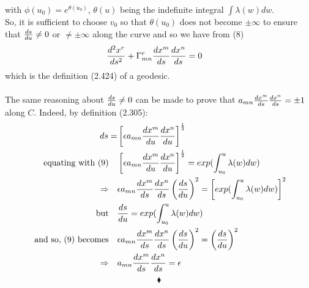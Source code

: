 with $\phi (u_0) =  e^{\theta(u_0)}$, $\theta(u)$ being the indefinite integral $\int \lambda (w)dw $.\\
So, it is sufficient to choose $v_0$ so that $\theta(u_0)$ does not become  $\pm \infty$ to ensure that $\dv{s}{u} \ne 0$ or $ \ne \pm \infty$ along the curve and so we have from (8)
\begin{align}
\dv[2]{x^r}{s} +\Gamma^r_{mn}\dv{x^m}{s}\dv{x^n}{s}  &=  0\end{align}
which is the definition (2.424) of a geodesic.\\\\
The same reasoning about $\dv{s}{u} \ne 0$ can be made to prove that $a_{mn}\dv{x^m}{s}\dv{x^n}{s} = \pm1$ along $C$. Indeed, by definition (2.305):
\begin{align}
\ ds = &\left[ \epsilon a_{mn}\dv{x^m}{u}\dv{x^n}{u}\right]^\frac{1}{2}\\
\text{ equating with (9)} \quad   &\left[ \epsilon a_{mn}\dv{x^m}{u}\dv{x^n}{u}\right]^\frac{1}{2} =                 exp(\int_{u_0}^u \lambda (w)dw)\\
\Rightarrow \quad &\epsilon a_{mn}\dv{x^m}{s}\dv{x^n}{s}\left (\dv{s}{u}\right )^2 =  \left[ exp(\int_{u_0}^u \lambda (w)dw) \right]^2\\
\text{but} \quad &\dv{s}{u} = exp(\int_{u_0}^u \lambda (w)dw)\\
\text{ and so, (9) becomes} \quad &\epsilon a_{mn}\dv{x^m}{s}\dv{x^n}{s}\left (\dv{s}{u}\right )^2 =  \left (\dv{s}{u}\right )^2\\
\Rightarrow \quad & a_{mn}\dv{x^m}{s}\dv{x^n}{s}=\epsilon
\end{align}
$$\blacklozenge$$
\newpage


